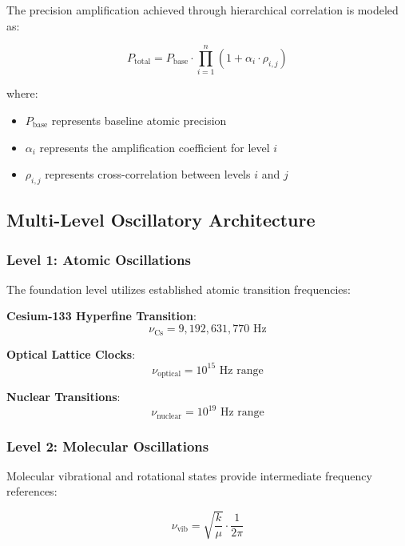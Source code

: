 \documentclass[12pt,a4paper]{article}
\begin{document}
{The precision amplification achieved through hierarchical correlation is modeled as:

\begin{equation}
P_{\text{total}} = P_{\text{base}} \cdot \prod_{i=1}^{n} (1 + \alpha_i \cdot \rho_{i,j})
\end{equation}

where:
\begin{itemize}
\item $P_{\text{base}}$ represents baseline atomic precision
\item $\alpha_i$ represents the amplification coefficient for level $i$
\item $\rho_{i,j}$ represents cross-correlation between levels $i$ and $j$
\end{itemize}

\subsection{Multi-Level Oscillatory Architecture}

\subsubsection{Level 1: Atomic Oscillations}

The foundation level utilizes established atomic transition frequencies:

\textbf{Cesium-133 Hyperfine Transition}:
\begin{equation}
\nu_{\text{Cs}} = 9,192,631,770 \text{ Hz}
\end{equation}

\textbf{Optical Lattice Clocks}:
\begin{equation}
\nu_{\text{optical}} = 10^{15} \text{ Hz range}
\end{equation}

\textbf{Nuclear Transitions}:
\begin{equation}
\nu_{\text{nuclear}} = 10^{19} \text{ Hz range}
\end{equation}

\subsubsection{Level 2: Molecular Oscillations}

Molecular vibrational and rotational states provide intermediate frequency references:

\begin{equation}
\nu_{\text{vib}} = \sqrt{\frac{k}{\mu}} \cdot \frac{1}{2\pi}
\end{equation}

}
\end{document}
